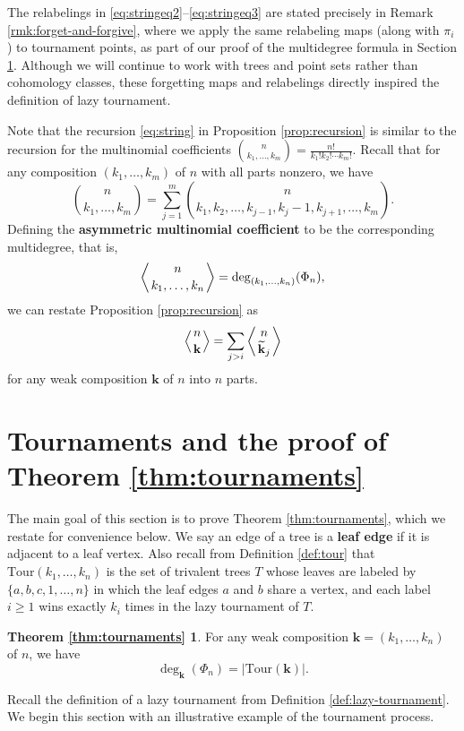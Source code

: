 \documentclass[11pt]{amsart}
\newcommand{\defn}{\textbf}
\newcommand{\emb}{\Phi}
\newcommand{\Tour}{\mathrm{Tour}}
\numberwithin{thm}{section}
\numberwithin{equation}{section}
\numberwithin{figure}{section}
\theoremstyle{definition}
\newtheorem*{TournamentsThm}{Theorem \ref{thm:tournaments}}
\def\multichoose#1#2{\left<\genfrac{}{}{0pt}{}{#1}{#2}\right>}
\begin{document}
The relabelings in \eqref{eq:stringeq2}--\eqref{eq:stringeq3} are stated precisely in Remark \ref{rmk:forget-and-forgive}, where we apply the same relabeling maps (along with $\pi_i$) to tournament points, as part of our proof of the multidegree formula in Section \ref{sec:proof}. Although we will continue to work with trees and point sets rather than cohomology classes, these forgetting maps and relabelings directly inspired the definition of lazy tournament.

Note that the recursion \eqref{eq:string} in Proposition \ref{prop:recursion} is similar to the recursion for the multinomial coefficients $\binom{n}{k_1,\ldots,k_m}=\frac{n!}{k_1!k_2!\cdots k_m!}$.  Recall that for any composition $(k_1,\ldots,k_m)$ of $n$ with all parts nonzero, we have $$\binom{n}{k_1,\ldots,k_m}=\sum_{j=1}^m \binom{n}{k_1,k_2,\ldots,k_{j-1},k_j-1,k_{j+1},\ldots,k_m}.$$  Defining the \textbf{asymmetric multinomial coefficient} to be the corresponding multidegree, that is, $$\multichoose{n}{k_1,\ldots,k_n}=\deg_{(k_1,\ldots,k_n)}(\emb_n),$$ we can restate Proposition \ref{prop:recursion} as $$\multichoose{n}{\bf k}=\sum_{j>i} \multichoose{n}{\widetilde{\bf k}_j}$$
for any weak composition $\mathbf{k}$ of $n$ into $n$ parts.

\section{Tournaments and the proof of Theorem \ref{thm:tournaments}}\label{sec:proof}

The main goal of this section is to prove Theorem \ref{thm:tournaments}, which we restate for convenience below. We say an edge of a tree is a \defn{leaf edge} if it is adjacent to a leaf vertex.  Also recall from Definition \ref{def:tour} that $\Tour(k_1,\ldots,k_n)$ is the set of trivalent trees $T$ whose leaves are labeled by $\{a,b,c,1,\dots, n\}$ in which the leaf edges $a$ and $b$ share a vertex, and each label $i\geq 1$ wins exactly $k_i$ times in the lazy tournament of $T$.

\begin{TournamentsThm}
   For any weak composition $\mathbf{k}=(k_1,\ldots,k_n)$ of $n$, we have $$\deg_{\mathbf{k}}(\emb_n)=|\Tour(\mathbf{k})|.$$
\end{TournamentsThm}
   
Recall the definition of a lazy tournament from Definition \ref{def:lazy-tournament}. We begin this section with an illustrative example of the tournament process.
\end{document}
